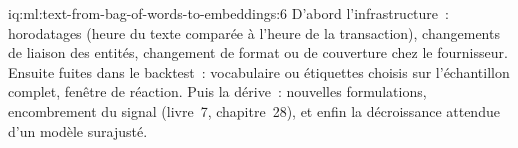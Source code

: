 \begin{solution}{iq:ml:text-from-bag-of-words-to-embeddings:6}
D'abord l'infrastructure~: horodatages (heure du texte comparée à l'heure de la transaction), changements de liaison des entités, changement de format ou de couverture chez le fournisseur. Ensuite
fuites dans le backtest~: vocabulaire ou étiquettes choisis sur l'échantillon complet, fenêtre de réaction. Puis la dérive~: nouvelles formulations,
encombrement du signal (livre~7, chapitre~28), et enfin la décroissance attendue d'un modèle surajusté.
\end{solution}
